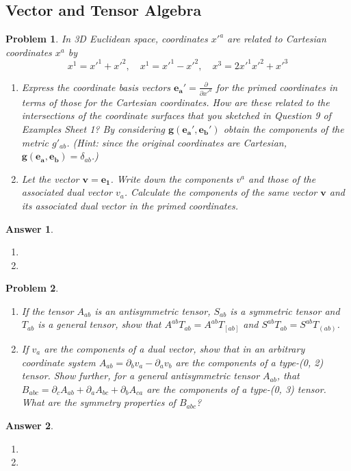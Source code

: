 \documentclass[a4paper]{article}
\newtheorem{ans}{Answer}[subsection]
\theoremstyle{new}
\newtheorem{qns}{Problem}[section]
\begin{document}
\subsection*{Vector and Tensor Algebra}
\begin{qns}
In 3D Euclidean space, coordinates $x'^a$ are related to Cartesian coordinates $x^a$ by
$$x^1=x'^1+x'^2,\quad  x^1=x'^1-x'^2,\quad x^3=2x'^1x'^2+x'^3$$
\begin{enumerate}[label=(\alph*)]
\item Express the coordinate basis vectors $\mathbf{e_a'}=\frac{\partial}{\partial x'^a}$ for the primed coordinates in terms of those for the Cartesian coordinates. How are these related to the intersections of the coordinate surfaces that you sketched in Question 9 of Examples Sheet 1? By considering $\mathbf{g}(\mathbf{e_a'},\mathbf{e_b'})$ obtain the components of the metric $g'_{ab}$. (Hint: since the original coordinates are Cartesian, $\mathbf{g}(\mathbf{e_a},\mathbf{e_b})=\delta_{ab}$.) 
\item Let the vector $\mathbf{v}=\mathbf{e_1}$. Write down the components $v^a$ and those of the associated dual vector $v_a$. Calculate the components of the same vector $\mathbf{v}$ and its associated dual vector in the primed coordinates. 
\end{enumerate}
\end{qns}
\begin{ans}\leavevmode
\begin{enumerate}[label=(\alph*)]
\item

\item 
\end{enumerate}
\end{ans}
\begin{qns}\leavevmode
\begin{enumerate}[label=(\alph*)]
\item If the tensor $A_{ab}$ is an antisymmetric tensor, $S_{ab}$ is a symmetric tensor and $T_{ab}$ is a general tensor, show that $A^{ab}T_{ab} = A^{ab}T_{[ab]}$ and $S^{ab}T_{ab}=S^{ab}T_{(ab)}$. 
\item If $v_a$ are the components of a dual vector, show that in an arbitrary coordinate system $A_{ab} = \partial_bv_a−\partial_av_b$ are the components of a type-(0, 2) tensor. Show further, for a general antisymmetric tensor $A_{ab}$, that $B_{abc} = \partial_cA_{ab} + \partial_aA_{bc} + \partial_bA_{ca}$ are the components of a type-(0, 3) tensor. What are the symmetry properties of $B_{abc}$?
\end{enumerate}
\end{qns}
\begin{ans}\leavevmode
\begin{enumerate}[label=(\alph*)]
\item

\item 
\end{enumerate}
\end{ans}
\newpage
\end{document}
